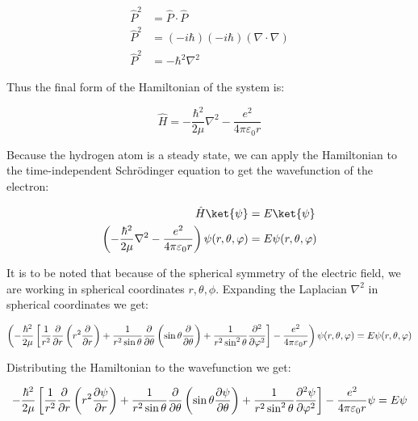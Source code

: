 \documentclass{article}
\begin{document}
    \begin{align}
        \hat{P}^2 &= \hat{P}\cdot\hat{P} \\
        \hat{P}^2 &= (-i\hbar)(-i\hbar)(\nabla\cdot\nabla) \\
        \hat{P}^2 &= -\hbar^2\nabla^2
    \end{align}

    Thus the final form of the Hamiltonian of the system is:

    \begin{equation}
        \hat{H} = -\frac{\hbar^2}{2\mu}\nabla^2 - \frac{e^{2}}{4\pi\varepsilon_{0}r}
    \end{equation}

    Because the hydrogen atom is a steady state, we can apply the Hamiltonian to the time-independent Schrödinger equation to get the wavefunction of the electron:

    \begin{align}
        \hat{H}\ket{\psi} &= E\ket{\psi} \\
        \left( -\frac{\hbar^2}{2\mu}\nabla^2 - \frac{e^{2}}{4\pi\varepsilon_{0}r} \right)\psi(r, \theta, \varphi) &= E\psi(r, \theta, \varphi)
    \end{align}

    It is to be noted that because of the spherical symmetry of the electric field, we are working in spherical coordinates $r, \theta, \phi$. Expanding the Laplacian $\nabla^2$ in
    spherical coordinates we get:

    \begin{equation}
        \left( -\frac{\hbar^2}{2\mu}\left[ \frac{1}{r^2}\pdv{}{r}\left( r^2\pdv{}{r} \right) + \frac{1}{r^2\sin\theta}\pdv{}{\theta}\left( \sin\theta\pdv{}{\theta} \right) + \frac{1}{r^2\sin^2\theta}\pdv[order=2]{}{\varphi} \right]
        - \frac{e^{2}}{4\pi\varepsilon_{0}r} \right)\psi(r, \theta, \varphi) = E\psi(r, \theta, \varphi)
    \end{equation}

    Distributing the Hamiltonian to the wavefunction we get:

    \begin{equation}
        -\frac{\hbar^2}{2\mu}\left[ \frac{1}{r^2}\pdv{}{r}\left( r^2\pdv{\psi}{r} \right) + \frac{1}{r^2\sin\theta}\pdv{}{\theta}\left( \sin\theta\pdv{\psi}{\theta} \right) + \frac{1}{r^2\sin^2\theta}\pdv[order=2]{\psi}{\varphi} \right]
        - \frac{e^{2}}{4\pi\varepsilon_{0}r}\psi = E\psi
    \end{equation}
\end{document}
